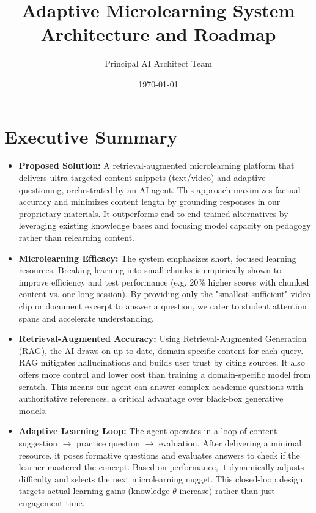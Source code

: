 \documentclass[11pt]{article}
\begin{document}
\title{Adaptive Microlearning System Architecture and Roadmap}
\author{Principal AI Architect Team}
\date{\today}
\maketitle

\tableofcontents
\newpage

\section{Executive Summary}
\begin{itemize}
    \item \textbf{Proposed Solution:} A retrieval-augmented microlearning platform that delivers ultra-targeted content snippets (text/video) and adaptive questioning, orchestrated by an AI agent. This approach maximizes factual accuracy and minimizes content length by grounding responses in our proprietary materials. It outperforms end-to-end trained alternatives by leveraging existing knowledge bases and focusing model capacity on pedagogy rather than relearning content.
    \item \textbf{Microlearning Efficacy:} The system emphasizes short, focused learning resources. Breaking learning into small chunks is empirically shown to improve efficiency and test performance (e.g. 20\% higher scores with chunked content vs. one long session). By providing only the "smallest sufficient" video clip or document excerpt to answer a question, we cater to student attention spans and accelerate understanding.
    \item \textbf{Retrieval-Augmented Accuracy:} Using Retrieval-Augmented Generation (RAG), the AI draws on up-to-date, domain-specific content for each query. RAG mitigates hallucinations and builds user trust by citing sources. It also offers more control and lower cost than training a domain-specific model from scratch. This means our agent can answer complex academic questions with authoritative references, a critical advantage over black-box generative models.
    \item \textbf{Adaptive Learning Loop:} The agent operates in a loop of content suggestion $\to$ practice question $\to$ evaluation. After delivering a minimal resource, it poses formative questions and evaluates answers to check if the learner mastered the concept. Based on performance, it dynamically adjusts difficulty and selects the next microlearning nugget. This closed-loop design targets actual learning gains (knowledge $\theta$ increase) rather than just engagement time.

\end{itemize}
\end{document}
